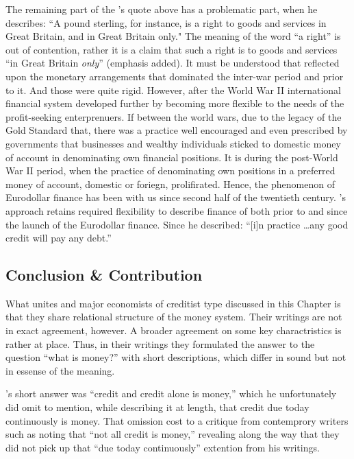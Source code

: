 The remaining part of the \citeauthor{schumacher1943}'s quote above has a problematic part, when he describes: ``A pound sterling, for instance, is a right to goods and services in Great Britain, and in Great Britain only." The meaning of the word ``a right'' is out of contention, rather it is a claim that such a right is to goods and services ``in Great Britain \textit{only}'' (emphasis added). It must be understood that \citeauthor{schumacher1943} reflected upon the monetary arrangements that dominated the inter-war period and prior to it. And those were quite rigid. However, after the World War II international financial system developed further by becoming more flexible to the needs of the profit-seeking enterprenuers. If between the world wars, due to the legacy of the Gold Standard that, there was a practice well encouraged and even prescribed by governments that businesses and wealthy individuals sticked to domestic money of account in denominating own financial positions. It is during the post-World War II period, when the practice of denominating own positions in a preferred money of account, domestic or foriegn, prolifirated. Hence, the phenomenon of Eurodollar finance has been with us since second half of the twentieth century. \citeauthor{innes1913}'s approach retains required flexibility to describe finance of both prior to and since the launch of the Eurodollar finance. Since he described: ``[i]n practice \dots any good credit will pay any debt.''~\citep[p.~152]{innes1914} 

\subsection{Conclusion \& Contribution}

What unites \citeauthor{innes1913} and major economists of creditist type discussed in this Chapter is that they share relational structure of the money system. Their writings are not in exact agreement, however. A broader agreement on some key charactristics is rather at place. Thus, in their writings they formulated the answer to the question ``what is money?'' with short descriptions, which differ in sound but not in essense of the meaning. 

\citeauthor{innes1913}'s short answer was ``credit and credit alone is money,'' which he unfortunately did omit to mention, while describing it at length, that credit due today continuously is money. That omission cost to \citeauthor{innes1913} a critique from contemprory writers such as \cite{ingham2004,goodhart2005,borio2018} noting that ``not all credit is money,'' revealing along the way that they did not pick up that ``due today continuously'' extention from his writings.

